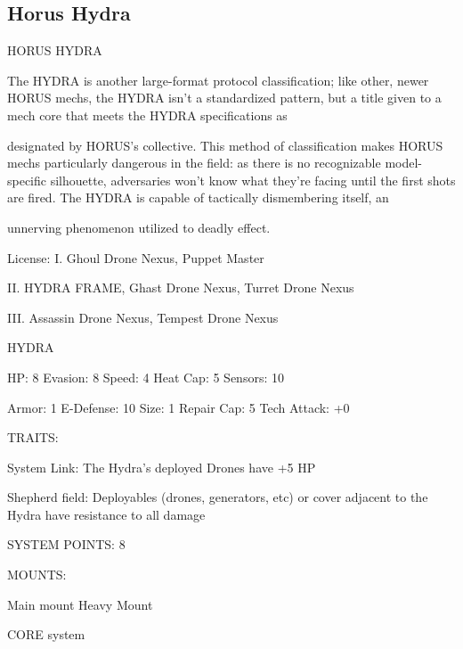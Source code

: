 \subsection{Horus Hydra}


                                           HORUS HYDRA  

The HYDRA is another large-format protocol classification; like other, newer HORUS mechs, the HYDRA  
isn’t a standardized pattern, but a title given to a mech core that meets the HYDRA specifications as  

designated by HORUS’s collective. This method of classification makes HORUS mechs particularly  
dangerous in the field: as there is no recognizable model-specific silhouette, adversaries won’t know what  
they’re facing until the first shots are fired. The HYDRA is capable of tactically dismembering itself, an  

unnerving phenomenon utilized to deadly effect.  

                                                  License:  
I. Ghoul Drone Nexus, Puppet Master
 
II. HYDRA FRAME, Ghast Drone Nexus, Turret Drone Nexus
 
III. Assassin Drone Nexus, Tempest Drone Nexus
 

                                                  HYDRA 

 HP: 8          Evasion: 8                            Speed:  4          Heat Cap: 5       Sensors: 10 

 Armor: 1       E-Defense: 10                         Size: 1            Repair Cap: 5     Tech Attack:  
                                                                                           +0 

                                                  TRAITS: 

 System Link: The Hydra’s deployed Drones have +5 HP
 
 Shepherd field: Deployables (drones, generators, etc) or cover adjacent to the Hydra have resistance  
 to all damage 

                                            SYSTEM POINTS: 8 

                                                 MOUNTS: 

 Main mount                        Heavy Mount 

                                               CORE system 

                                                                                                           


